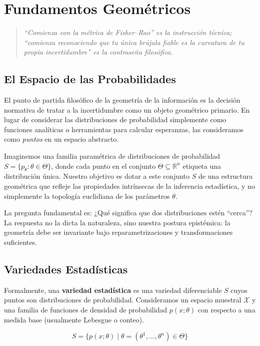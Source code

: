 \chapter{Fundamentos Geométricos}

\begin{quotation}
	\itshape
	``Comienza con la métrica de Fisher--Rao'' es la instrucción técnica; ``comienza reconociendo que tu única brújula fiable es la curvatura de tu propia incertidumbre'' es la contraseña filosófica.
\end{quotation}

\section{El Espacio de las Probabilidades}

El punto de partida filosófico de la geometría de la información es la decisión normativa de tratar a la incertidumbre como un objeto geométrico primario. En lugar de considerar las distribuciones de probabilidad simplemente como funciones analíticas o herramientas para calcular esperanzas, las consideramos como \emph{puntos} en un espacio abstracto.

Imaginemos una familia paramétrica de distribuciones de probabilidad $S = \{p_\theta : \theta \in \Theta\}$, donde cada punto en el conjunto $\Theta \subseteq \mathbb{R}^n$ etiqueta una distribución única. Nuestro objetivo es dotar a este conjunto $S$ de una estructura geométrica que refleje las propiedades intrínsecas de la inferencia estadística, y no simplemente la topología euclidiana de los parámetros $\theta$.

La pregunta fundamental es: ¿Qué significa que dos distribuciones estén ``cerca''? La respuesta no la dicta la naturaleza, sino nuestra postura epistémica: la geometría debe ser invariante bajo reparametrizaciones y transformaciones suficientes.

\section{Variedades Estadísticas}

Formalmente, una \textbf{variedad estadística} es una variedad diferenciable $S$ cuyos puntos son distribuciones de probabilidad. Consideramos un espacio muestral $\mathcal{X}$ y una familia de funciones de densidad de probabilidad $p(x; \theta)$ con respecto a una medida base (usualmente Lebesgue o conteo).

\[ S = \{ p(x; \theta) \mid \theta = (\theta^1, \dots, \theta^n) \in \Theta \} \]

